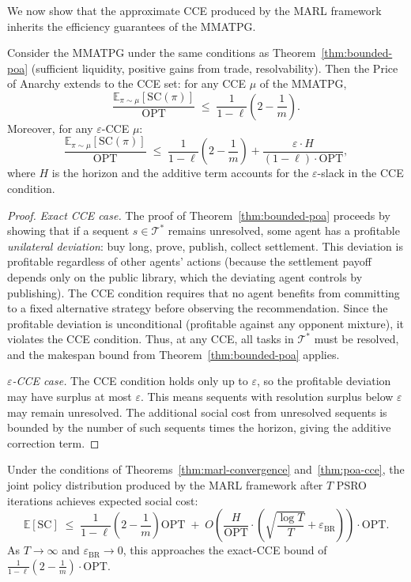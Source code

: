 We now show that the approximate CCE produced by the MARL framework inherits the efficiency guarantees of the MMATPG.

\begin{theorem}\label{thm:poa-cce}
Consider the MMATPG under the same conditions as Theorem~\ref{thm:bounded-poa} (sufficient liquidity, positive gains from trade, resolvability). Then the Price of Anarchy extends to the CCE set: for any CCE $\mu$ of the MMATPG,
\[
\frac{\mathbb{E}_{\pi\sim\mu}[\mathrm{SC}(\pi)]}{\mathrm{OPT}} \;\le\; \frac{1}{1-\ell}\left(2 - \frac{1}{m}\right).
\]
Moreover, for any $\varepsilon$-CCE $\mu$:
\[
\frac{\mathbb{E}_{\pi\sim\mu}[\mathrm{SC}(\pi)]}{\mathrm{OPT}} \;\le\; \frac{1}{1-\ell}\left(2 - \frac{1}{m}\right) + \frac{\varepsilon\cdot H}{(1-\ell)\cdot\mathrm{OPT}},
\]
where $H$ is the horizon and the additive term accounts for the $\varepsilon$-slack in the CCE condition.
\end{theorem}

\begin{proof}
\emph{Exact CCE case.} The proof of Theorem~\ref{thm:bounded-poa} proceeds by showing that if a sequent $s\in\mathcal{T}^*$ remains unresolved, some agent has a profitable \emph{unilateral deviation}: buy long, prove, publish, collect settlement. This deviation is profitable regardless of other agents' actions (because the settlement payoff depends only on the public library, which the deviating agent controls by publishing). The CCE condition requires that no agent benefits from committing to a fixed alternative strategy before observing the recommendation. Since the profitable deviation is unconditional (profitable against any opponent mixture), it violates the CCE condition. Thus, at any CCE, all tasks in $\mathcal{T}^*$ must be resolved, and the makespan bound from Theorem~\ref{thm:bounded-poa} applies.

\emph{$\varepsilon$-CCE case.} The CCE condition holds only up to $\varepsilon$, so the profitable deviation may have surplus at most $\varepsilon$. This means sequents with resolution surplus below $\varepsilon$ may remain unresolved. The additional social cost from unresolved sequents is bounded by the number of such sequents times the horizon, giving the additive correction term.
\end{proof}

\begin{corollary}\label{cor:marl-efficiency}
Under the conditions of Theorems~\ref{thm:marl-convergence} and~\ref{thm:poa-cce}, the joint policy distribution produced by the MARL framework after $T$ PSRO iterations achieves expected social cost:
\[
\mathbb{E}[\mathrm{SC}] \;\le\; \frac{1}{1-\ell}\left(2-\frac{1}{m}\right)\mathrm{OPT} \;+\; O\!\left(\frac{H}{\mathrm{OPT}}\cdot\left(\sqrt{\frac{\log T}{T}} + \varepsilon_{\mathrm{BR}}\right)\right)\cdot\mathrm{OPT}.
\]
As $T\to\infty$ and $\varepsilon_{\mathrm{BR}}\to 0$, this approaches the exact-CCE bound of $\frac{1}{1-\ell}(2-\frac{1}{m})\cdot\mathrm{OPT}$.
\end{corollary}


